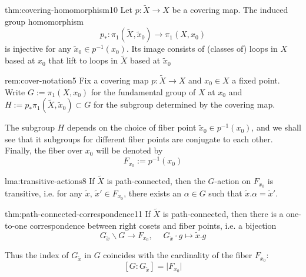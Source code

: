 \documentclass[landscape, 8pt]{extarticle}
\begin{document}
\begin{multicols*}{3}
\begin{thm}{thm:covering-homomorphism}{10}
	Let $p : \tilde{X} \to X$ be a covering map. The induced group homomorphism
	\[p_{\ast} : \pi_{1}(\tilde{X}, \tilde{x}_{0}) \to \pi_{1}(X, x_{0})\]
	is injective for any $\tilde{x}_{0}\in p^{-1}(x_{0})$. Its image consists of (classes of) loops in $X$ based at $x_{0}$ that lift to loops in $\tilde{X}$ based at $\tilde{x}_{0}$
\end{thm}

\vspace{-7pt}
\begin{rem}{rem:cover-notation}{5}
	\vspace{-2pt}
	Fix a covering map $p : \tilde{X} \to X$ and $x_{0}\in X$ a fixed point. Write $G := \pi_{1}(X, x_{0})$ for the fundamental group of $X$ at $x_{0}$ and $H := p_{\ast} \pi_{1}(\tilde{X}, \tilde{x}_{0}) \subset G$ for the subgroup determined by the covering map.

	The subgroup $H$ depends on the choice of fiber point $\tilde{x}_{0}\in p^{-1}(x_{0})$, and we shall see that it subgroups for different fiber points are conjugate to each other. Finally, the fiber over $x_{0}$ will be denoted by
	\[F_{x_{0}} := p^{-1}(x_{0})\]
\end{rem}


\vspace{-7pt}
\begin{lma}{lma:transitive-actions}{8}
	\vspace{-2pt}
	If $\tilde{X}$ is path-connected, then the $G$-action on $F_{x_{0}}$ is transitive, i.e. for any $\tilde{x},\, \tilde{x}'\in F_{x_{0}}$, there exists an $\alpha\in G$ such that $\tilde{x}.\alpha = \tilde{x}'$.
\end{lma}


\vspace{-7pt}
\begin{thm}{thm:path-connected-correspondence}{11}
	\vspace{-2pt}
	If $\tilde{X}$ is path-connected, then there is a one-to-one correspondence between right cosets and fiber points, i.e. a bijection
	\[G_{\tilde{x}} \backslash G \to F_{x_{0}},\;\quad G_{\tilde{x}} \cdot g \mapsto \tilde{x}.g\]
	\par\vspace{-5pt}
	\tcbline
	Thus the index of $G_{\tilde{x}}$ in $G$ coincides with the cardinality of the fiber $F_{x_{0}}$:
	\vspace{-6pt}
	\setcounter{equation}{19}
	\begin{equation}\label{eq:path-connected-correspondence}
		[G : G_{\tilde{x}}] = \lvert F_{x_{0}} \rvert
	\end{equation}


\end{thm}
\end{multicols*}
\end{document}
